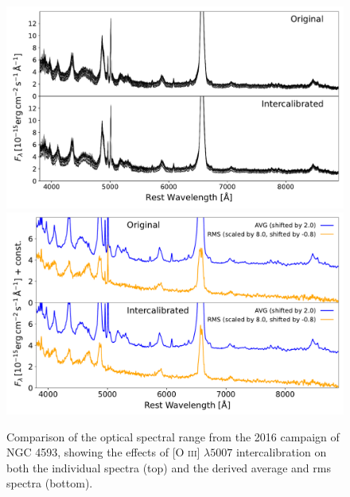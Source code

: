 \begin{figure}[!ht]
	\centering
	\includegraphics[width=\textwidth]{pictures/Chapter3/comparison_spectra}
	\vspace{0.5cm} %
	\includegraphics[width=\textwidth]{pictures/Chapter3/comparison_avg_rms}
	\caption{Comparison of the optical spectral range from the 2016 campaign of NGC 4593, showing the effects of [O \textsc{iii}] $\lambda5007$ intercalibration on both the individual spectra (top) and the derived average and rms spectra (bottom).}
	\label{fig:comparison_combined}
\end{figure}



